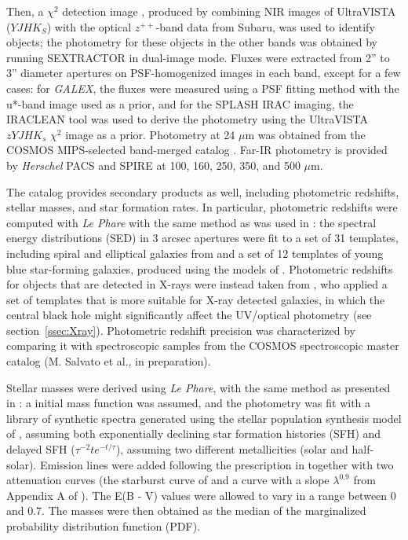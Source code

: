 Then, a $\chi^2$ detection image \citep{1999AJ....117...68S}, produced by combining NIR images of UltraVISTA ($YJHK_S$) with the optical $z^{++}$-band data from Subaru, was used to identify objects; the photometry for these objects in the other bands was obtained by running SEXTRACTOR in dual-image mode. Fluxes were extracted from 2'' to 3'' diameter apertures on PSF-homogenized images in each band, except for a few cases: for \textit{GALEX}, the fluxes were measured using a PSF fitting method with the u*-band image used as a prior, and for the SPLASH IRAC imaging, the IRACLEAN tool \citep{2012ApJS..203...23H} was used to derive the photometry using the UltraVISTA $zYJHK_s$ $\chi^2$ image as a prior.
Photometry at 24 $\mu$m was obtained from the COSMOS MIPS-selected band-merged catalog \citep{2009ApJ...703..222L}. Far-IR photometry is provided by \textit{Herschel} PACS \citep[PEP guaranteed-time program,][]{2011A&A...532A..90L} and SPIRE \citep[HERMES consortium,][]{2012MNRAS.424.1614O} at 100, 160, 250, 350, and 500 $\mu$m.

The \citet{2016ApJS..224...24L} catalog provides secondary products as well, including photometric redshifts, stellar masses, and star formation rates. In particular, photometric redshifts were computed with \emph{Le Phare} \citep{2002MNRAS.329..355A, 2006A&A...457..841I} with the same method as was used in \citet{2013A&A...556A..55I}: the spectral energy distributions (SED) in 3 arcsec apertures were fit to a set of 31 templates, including spiral and elliptical galaxies from \citet{2007ApJ...663...81P} and a set of 12 templates of young blue star-forming galaxies, produced using the models of \citet{2003MNRAS.344.1000B}. Photometric redshifts for objects that are detected in X-rays were instead taken from \citet{2016ApJ...817...34M}, who applied a set of templates that is more suitable for X-ray detected galaxies, in which the central black hole might significantly affect the UV/optical photometry (see section~\ref{ssec:Xray}). Photometric redshift precision was characterized by comparing it with spectroscopic samples from the COSMOS spectroscopic master catalog (M. Salvato et al., in preparation).%

Stellar masses were derived using \emph{Le Phare}, with the same method as presented in \citet{2015A&A...579A...2I}: a \citet{2003PASP..115..763C} initial mass function was assumed, and the photometry was fit with a library of synthetic spectra generated using the stellar population synthesis model of \citet{2003MNRAS.344.1000B}, assuming both exponentially declining star formation histories (SFH) and delayed SFH ($\tau^{-2}te^{-t/\tau}$), assuming two different metallicities (solar and half-solar). Emission lines were added following the prescription in \citet{2009ApJ...690.1236I} together with two attenuation curves (the starburst curve of \citealt{2000ApJ...533..682C} and a curve with a slope $\lambda^{0.9}$ from Appendix A of \citealt{2013A&A...558A..67A}). The E(B - V) values were allowed to vary in a range between 0 and 0.7. The masses were then obtained as the median of the marginalized probability distribution function (PDF).

